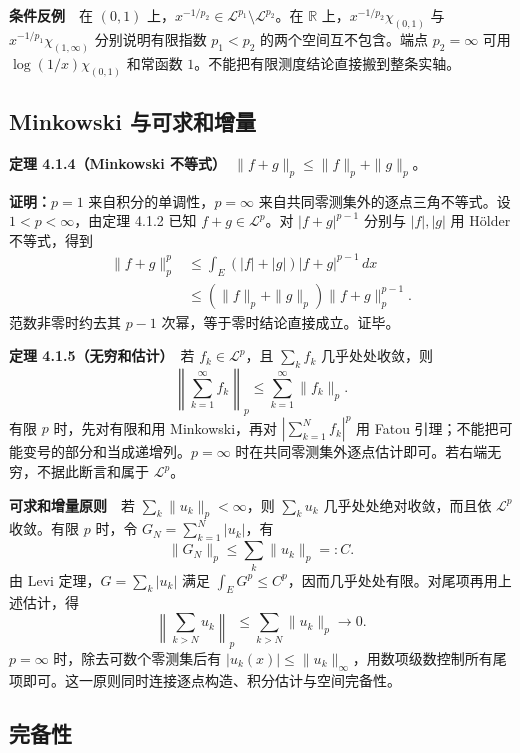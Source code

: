 \documentclass[11pt,a4paper]{article}
\begin{document}
\textbf{条件反例}　在 \((0,1)\)
上，\(x^{-1/p_2}\in\mathcal L^{p_1}\setminus\mathcal L^{p_2}\)。在
\(\mathbb R\) 上，\(x^{-1/p_2}\chi_{(0,1)}\) 与
\(x^{-1/p_1}\chi_{(1,\infty)}\) 分别说明有限指数 \(p_1<p_2\)
的两个空间互不包含。端点 \(p_2=\infty\) 可用 \(\log(1/x)\chi_{(0,1)}\)
和常函数 \(1\)。不能把有限测度结论直接搬到整条实轴。

\subsection{Minkowski
与可求和增量}\label{ch04-s1-minkowski-ux4e0eux53efux6c42ux548cux589eux91cf}

\textbf{定理 4.1.4（Minkowski
不等式）}　\(\|f+g\|_p\le\|f\|_p+\|g\|_p\)。

\textbf{证明：}\(p=1\) 来自积分的单调性，\(p=\infty\)
来自共同零测集外的逐点三角不等式。设 \(1<p<\infty\)，由定理 4.1.2 已知
\(f+g\in\mathcal L^p\)。对 \(|f+g|^{p-1}\) 分别与 \(|f|,|g|\) 用 Hölder
不等式，得到 \[
\begin{aligned}
\|f+g\|_p^p
&\le\int_E(|f|+|g|)|f+g|^{p-1}\,dx\\
&\le(\|f\|_p+\|g\|_p)\|f+g\|_p^{p-1}.
\end{aligned}
\] 范数非零时约去其 \(p-1\) 次幂，等于零时结论直接成立。证毕。

\textbf{定理 4.1.5（无穷和估计）}　若 \(f_k\in\mathcal L^p\)，且
\(\sum_k f_k\) 几乎处处收敛，则 \[
\left\|\sum_{k=1}^\infty f_k\right\|_p\le\sum_{k=1}^\infty\|f_k\|_p.
\] 有限 \(p\) 时，先对有限和用 Minkowski，再对 \(|\sum_{k=1}^Nf_k|^p\)
用 Fatou 引理；不能把可能变号的部分和当成递增列。\(p=\infty\)
时在共同零测集外逐点估计即可。若右端无穷，不据此断言和属于
\(\mathcal L^p\)。

\textbf{可求和增量原则}　若 \(\sum_k\|u_k\|_p<\infty\)，则
\(\sum_k u_k\) 几乎处处绝对收敛，而且依 \(\mathcal L^p\) 收敛。有限
\(p\) 时，令 \(G_N=\sum_{k=1}^N|u_k|\)，有 \[
\|G_N\|_p\le\sum_k\|u_k\|_p=:C.
\] 由 Levi 定理，\(G=\sum_k|u_k|\) 满足
\(\int_EG^p\le C^p\)，因而几乎处处有限。对尾项再用上述估计，得 \[
\left\|\sum_{k>N}u_k\right\|_p\le\sum_{k>N}\|u_k\|_p\longrightarrow0.
\] \(p=\infty\) 时，除去可数个零测集后有
\(|u_k(x)|\le\|u_k\|_\infty\)，用数项级数控制所有尾项即可。这一原则同时连接逐点构造、积分估计与空间完备性。

\subsection{完备性}\label{ch04-s1-ux5b8cux5907ux6027}
\end{document}

